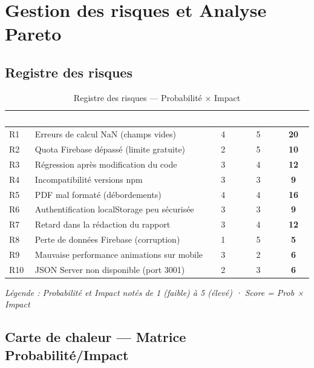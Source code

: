 \documentclass[12pt,a4paper]{report}
\begin{document}
\section{Gestion des risques et Analyse Pareto}

\subsection{Registre des risques}

\begin{table}[H]
\centering
\caption{Registre des risques — Probabilité × Impact}
\label{tab:risques}
\begin{tabularx}{\textwidth}{|l|X|c|c|c|}
\hline
\rowcolor{emsiblue}\textcolor{white}{\textbf{Réf.}} & \textcolor{white}{\textbf{Risque}} & \textcolor{white}{\textbf{Prob.}} & \textcolor{white}{\textbf{Impact}} & \textcolor{white}{\textbf{Score}} \\
\hline
R1 & Erreurs de calcul NaN (champs vides) & 4 & 5 & \textbf{20} \\
R2 & Quota Firebase dépassé (limite gratuite) & 2 & 5 & \textbf{10} \\
R3 & Régression après modification du code & 3 & 4 & \textbf{12} \\
R4 & Incompatibilité versions npm & 3 & 3 & \textbf{9} \\
R5 & PDF mal formaté (débordements) & 4 & 4 & \textbf{16} \\
R6 & Authentification localStorage peu sécurisée & 3 & 3 & \textbf{9} \\
R7 & Retard dans la rédaction du rapport & 3 & 4 & \textbf{12} \\
R8 & Perte de données Firebase (corruption) & 1 & 5 & \textbf{5} \\
R9 & Mauvaise performance animations sur mobile & 3 & 2 & \textbf{6} \\
R10 & JSON Server non disponible (port 3001) & 2 & 3 & \textbf{6} \\
\hline
\end{tabularx}
\end{table}

\textit{Légende : Probabilité et Impact notés de 1 (faible) à 5 (élevé) · Score = Prob × Impact}

\subsection{Carte de chaleur — Matrice Probabilité/Impact}
\end{document}
